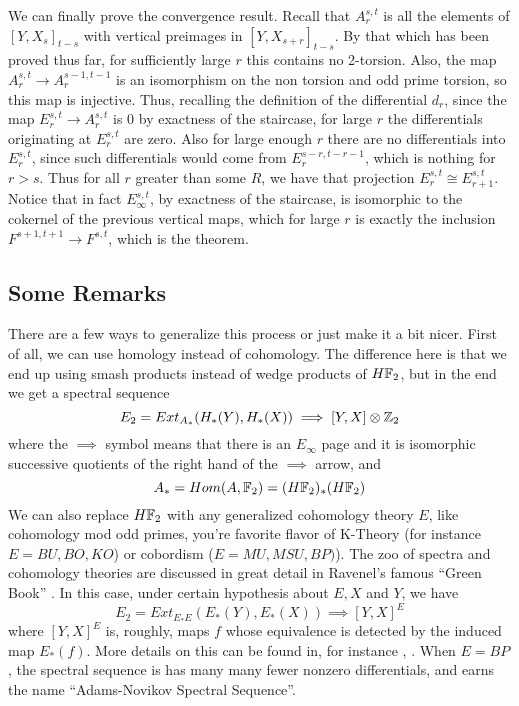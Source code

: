 We can finally prove the convergence result.
Recall that $A_r^{s,t}$ is all the elements of $[Y,X_s]_{t-s}$ with vertical preimages in $[Y,X_{s+r}]_{t-s}$.  
By that which has been proved thus far, for sufficiently large $r$ this contains no 2-torsion.  
Also, the map $A_r^{s,t}\to A_r^{s-1,t-1}$ is an isomorphism on the non torsion and odd prime torsion, so this map is injective.
Thus, recalling the definition of the differential $d_r$, since the map $E_r^{s,t}\to A_r^{s,t}$ is 0 by exactness of the staircase, for large $r$ the differentials originating at $E_r^{s,t}$ are zero.
Also for large enough $r$ there are no differentials into $E_r^{s,t}$, since such differentials would come from $E_r^{s-r,t-r-1}$, which is nothing for $r>s$.  
Thus for all $r$ greater than some $R$, we have that projection $E_r^{s,t}\cong E_{r+1}^{s,t}$.
Notice that in fact $E_\infty^{s,t}$, by exactness of the staircase, is isomorphic to the cokernel of the previous vertical maps, which for large $r$ is exactly the inclusion $F^{s+1,t+1}\to F^{s,t}$, which is the theorem.  


\subsection{Some Remarks}

There are a few ways to generalize this process or just make it a bit nicer.
First of all, we can use homology instead of cohomology.  
The difference here is that we end up using smash products instead of wedge products of $H\mathbb{F}_2$, but in the end we get a spectral sequence
\[E_2 = Ext_{A_*}(H_*(Y),H_*(X))\implies [Y,X]\otimes \mathbb{Z}_2\]
where the $\implies$ symbol means that there is an $E_\infty$ page and it is isomorphic successive quotients of the right hand of the $\implies$ arrow, and
\[A_*=Hom(A,\mathbb{F}_2)=(H\mathbb{F}_2)_*(H\mathbb{F}_2)\]
We can also replace $H\mathbb{F}_2$ with any generalized cohomology theory $E$, like cohomology mod odd primes, 
you're favorite flavor of K-Theory (for instance $E=BU,BO,KO$) or cobordism ($E=MU,MSU,BP)$).  
The zoo of spectra and cohomology theories are discussed in great detail in Ravenel's famous ``Green Book'' \cite{RavenelGreen}.
In this case, under certain hypothesis about $E,X$ and $Y$, we have
\[E_2 = Ext_{E_*E}(E_*(Y),E_*(X))\implies [Y,X]^{E}\]
where $[Y,X]^{E}$ is, roughly, maps $f$ whose equivalence is detected by the induced map $E_*(f)$.  
More details on this can be found in, for instance \cite{RavenelGreen}, \cite[Ch~IV]{H00RingSpectra}.  
When $E=BP$, the spectral sequence is has many many fewer nonzero differentials, and earns the name ``Adams-Novikov Spectral Sequence''.  


